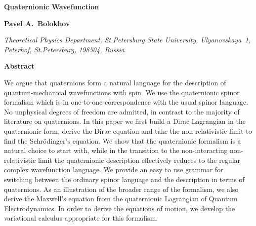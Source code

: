 \documentclass[epsfig,12pt]{article}
\begin{document}
\begin{titlepage}

\vskip 2cm
\begin{center}
{  \Large \bf  Quaternionic Wavefunction }
\end{center}
\vskip 0.5cm

\begin{center}

 {\large
 \bf   Pavel A.~Bolokhov
 }
\end {center}

\begin{center}
{\it Theoretical Physics Department, St.Petersburg State University, Ulyanovskaya~1, 
	Peterhof, St.Petersburg, 198504, Russia}
\end{center}




\begin{center}
{\large\bf Abstract}
\end{center}

\hspace{0.3cm}
	We argue that quaternions form a natural language for the description of
	quantum-mechanical wavefunctions with spin.
	We use the quaternionic spinor formalism which is in one-to-one correspondence with the usual
	spinor language.
	No unphysical degrees of freedom are admitted, in contrast to the majority of literature on quaternions.
	In this paper we first build a Dirac Lagrangian in the quaternionic form,
	derive the Dirac equation and take the non-relativistic limit to find the Schr\"odinger's equation.
	We show that the quaternionic formalism is a natural choice to start with,
	while in the transition to the non-interacting non-relativistic limit the quaternionic description 
	effectively reduces to the regular complex wavefunction language.
	We provide an easy to use grammar for switching between the ordinary spinor language
	and the description in terms of quaternions.
	As an illustration of the broader range of the formalism,
	we also derive the Maxwell's equation from the quaternionic Lagrangian of Quantum Electrodynamics.
	In order to derive the equations of motion, we develop the variational calculus
	appropriate for this formalism.
\vspace{2cm}


\end{titlepage}
\end{document}
